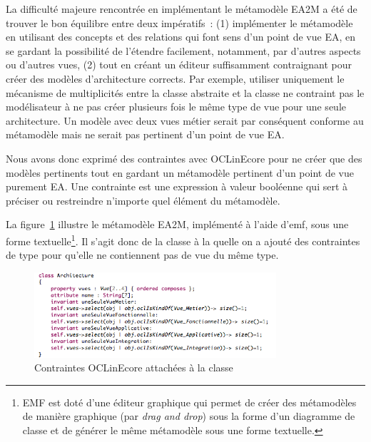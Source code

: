     La difficulté majeure rencontrée en implémentant le métamodèle EA2M a été de trouver le bon équilibre entre deux impératifs~: (1) implémenter le métamodèle en utilisant des concepts et des relations qui font sens d'un point de vue EA, en se gardant la possibilité de l'étendre facilement, notamment, par d'autres aspects ou d'autres vues, (2) tout en créant un éditeur suffisamment contraignant pour créer des modèles d'architecture corrects. Par exemple, utiliser uniquement le mécanisme de multiplicités entre la classe abstraite  et la classe  ne contraint pas le modélisateur à ne pas créer plusieurs fois le même type de vue pour une seule architecture. Un modèle avec deux vues métier serait par conséquent conforme au métamodèle mais ne serait pas pertinent d'un point de vue EA. 

    Nous avons donc exprimé des contraintes avec OCLinEcore pour ne créer que des modèles pertinents tout en gardant un métamodèle pertinent d'un point de vue purement EA.  Une contrainte est une expression à valeur booléenne qui sert à préciser ou restreindre n'importe quel élément du métamodèle.

    La figure~\ref{fig:contraintes_ocl_architecture} illustre le métamodèle EA2M, implémenté à l'aide d'\gls{emf}, sous une forme textuelle\footnote{EMF est doté d'une éditeur graphique qui permet de créer des métamodèles de manière graphique (par \emph{drag and drop}) sous la forme d'un diagramme de classe et de générer le même métamodèle sous une forme textuelle.}. Il s'agit donc de la classe  à la quelle on a ajouté des contraintes de type  pour qu'elle ne contiennent pas de vue du même type. 

    \begin{figure}[!htbp]
     \begin{center}
      \includegraphics[width=0.8\textwidth]{figures/5_implementation/ocl_in_ecore_vue.png}
     \end{center}
     \caption{Contraintes OCLinEcore attachées à la classe \protect{} }
     \label{fig:contraintes_ocl_architecture}
    \end{figure}

